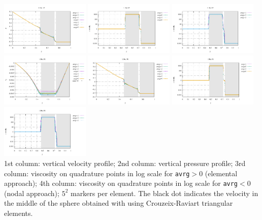 \begin{center}
\includegraphics[width=4.25cm]{python_codes/fieldstone_41/results/exp3/113x113/profile_p.pdf}
\includegraphics[width=4.25cm]{python_codes/fieldstone_41/results/exp3/113x113/profile_eta_elemental.pdf}
\includegraphics[width=4.25cm]{python_codes/fieldstone_41/results/exp3/113x113/profile_eta_nodal.pdf}\\
\includegraphics[width=4.25cm]{python_codes/fieldstone_41/results/exp3/129x129/profile_v.pdf}
\includegraphics[width=4.25cm]{python_codes/fieldstone_41/results/exp3/129x129/profile_p.pdf}
\includegraphics[width=4.25cm]{python_codes/fieldstone_41/results/exp3/129x129/profile_eta_elemental.pdf}
\includegraphics[width=4.25cm]{python_codes/fieldstone_41/results/exp3/129x129/profile_eta_nodal.pdf}\\
{\captionfont 
1st column: vertical velocity profile; 
2nd column: vertical pressure profile; 
3rd column: viscosity on quadrature points in log scale for {\tt avrg}$>0$ (elemental approach);
4th column: viscosity on quadrature points in log scale for {\tt avrg}$<0$ (nodal approach);
$5^2$ markers per element.
The black dot indicates the velocity in the middle of the sphere 
obtained with  using Crouzeix-Raviart triangular elements.} 
\end{center}
